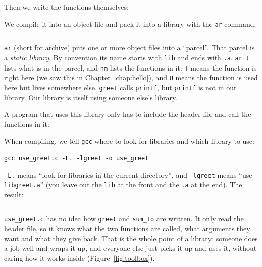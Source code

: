 
Then we write the functions themselves:


We compile it into an object file and pack it into a library with the \texttt{ar} command:
\inputminted[linenos=false]{text}{code/en/ch05/out/build_lib.txt}

\texttt{ar} (short for archive) puts one or more object files into a ``parcel''. That parcel is a \emph{static library}. By convention its name starts with \texttt{lib} and ends with \texttt{.a}. \texttt{ar t} lists what is in the parcel, and \texttt{nm} lists the functions in it: \texttt{T} means the function is right here (we saw this in Chapter~\ref{chap:hello}), and \texttt{U} means the function is used here but lives somewhere else. \texttt{greet} calls \texttt{printf}, but \texttt{printf} is not in our library. Our library is itself using someone else's library.

A program that uses this library only has to include the header file and call the functions in it:


When compiling, we tell \texttt{gcc} where to look for libraries and which library to use:
\begin{verbatim}
gcc use_greet.c -L. -lgreet -o use_greet
\end{verbatim}
\texttt{-L.} means ``look for libraries in the current directory'', and \texttt{-lgreet} means ``use \texttt{libgreet.a}'' (you leave out the \texttt{lib} at the front and the \texttt{.a} at the end). The result:
\inputminted[linenos=false]{text}{code/en/ch05/out/use_greet.txt}

\texttt{use\_greet.c} has no idea how \texttt{greet} and \texttt{sum\_to} are written. It only read the header file, so it knows what the two functions are called, what arguments they want and what they give back. That is the whole point of a library: someone does a job well and wraps it up, and everyone else just picks it up and uses it, without caring how it works inside (Figure~\ref{fig:toolbox}).

